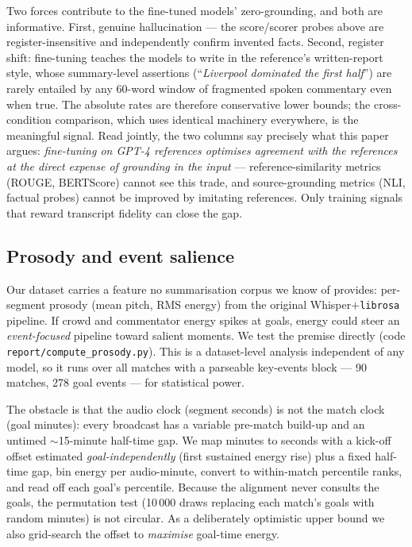 \documentclass[10pt,a4paper]{article}
\begin{document}
Two forces contribute to the fine-tuned models' zero-grounding, and both are informative. First, genuine hallucination --- the score/scorer probes above are register-insensitive and independently confirm invented facts. Second, register shift: fine-tuning teaches the models to write in the reference's written-report style, whose summary-level assertions (``\emph{Liverpool dominated the first half}'') are rarely entailed by any 60-word window of fragmented spoken commentary even when true. The absolute rates are therefore conservative lower bounds; the cross-condition comparison, which uses identical machinery everywhere, is the meaningful signal. Read jointly, the two columns say precisely what this paper argues: \emph{fine-tuning on GPT-4 references optimises agreement with the references at the direct expense of grounding in the input} --- reference-similarity metrics (ROUGE, BERTScore) cannot see this trade, and source-grounding metrics (NLI, factual probes) cannot be improved by imitating references. Only training signals that reward transcript fidelity can close the gap.

\subsection{Prosody and event salience}
\label{sec:prosody}

Our dataset carries a feature no summarisation corpus we know of provides: per-segment prosody (mean pitch, RMS energy) from the original Whisper$+$\texttt{librosa} pipeline. If crowd and commentator energy spikes at goals, energy could steer an \emph{event-focused} pipeline toward salient moments. We test the premise directly (code \texttt{report/compute\_prosody.py}). This is a dataset-level analysis independent of any model, so it runs over all matches with a parseable key-events block --- 90 matches, 278 goal events --- for statistical power.

The obstacle is that the audio clock (segment seconds) is not the match clock (goal minutes): every broadcast has a variable pre-match build-up and an untimed $\sim$15-minute half-time gap. We map minutes to seconds with a kick-off offset estimated \emph{goal-independently} (first sustained energy rise) plus a fixed half-time gap, bin energy per audio-minute, convert to within-match percentile ranks, and read off each goal's percentile. Because the alignment never consults the goals, the permutation test (10\,000 draws replacing each match's goals with random minutes) is not circular. As a deliberately optimistic upper bound we also grid-search the offset to \emph{maximise} goal-time energy.
\end{document}
